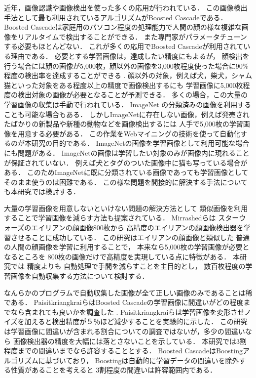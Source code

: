 近年，画像認識や画像検出を使った多くの応用が行われている．
この画像検出手法として最も利用されているアルゴリズムがBoosted Cascade\cite{Viola01rapidobject}である．
Boosted Cascadeは家庭用のパソコン程度の処理能力で人間の顔の様な複雑な画像をリアルタイムで検出することができる．
また専門家がパラメータチューンする必要もほとんどない．
これが多くの応用でBoosted Cascadeが利用されている理由である．
必要とする学習画像は，達成したい精度にもよるが，
顔検出を行う場合には顔の画像が5,000枚，顔以外の画像を3,000枚程度使った場合に90\%程度の検出率を達成することができる
\cite{Lienhart03empiricalanalysis}
.
顔以外の対象，例えば犬，柴犬，シャム猫といった対象をある程度以上の精度で画像検出するにも
学習画像に5,000枚程度の検出対象の画像が必要となることが予測できる．
多くの場合，この大量の学習画像の収集は手動で行われている．
ImageNet\cite{imagenet}
の分類済みの画像を利用することも可能な場合もある．
しかしImageNetに存在しない画像，例えば発売されたばかりの新製品や新種の動物などを画像検出するには
人手で5,000枚の学習画像を用意する必要がある．
この作業をWebマイニングの技術を使って自動化するのが本研究の目的である．
ImageNetの画像を学習画像として利用可能な場合にも問題がある．
ImageNetの画像は学習したい対象のみが画像内に現れることが保証されていない．
例えば犬とタグのついた画像中に猫も写っている場合がある．
このためImageNetに既に分類されている画像であっても学習画像としてそのまま使うのは困難である．
この様な問題を間接的に解決する手法についても本研究では検討する．

大量の学習画像を用意しないといけない問題の解決方法として
類似画像を利用することで学習画像を減らす方法も提案されている．
Mirrashed\cite{Mirrashed_2013_ICCV}らは
スターウォーズのエイリアンの顔画像800枚から
高精度のエイリアンの顔画像検出器を学習させることに成功している．
この研究はエイリアンの顔画像と類似した
普通の人間の顔画像を学習に利用することで，
本来なら5,000枚の学習画像が必要となるところを
800枚の画像だけで高精度を実現している点に特徴がある．
本研究では
精度よりも
自動処理で手間を減らすことを主目的とし，
数百枚程度の学習画像を自動収集する方法について検討する．

なんらかのプログラムで自動収集した画像が全て正しい画像のみであることは稀である．
PaisitkriangkraiらはBoosted Cascadeの学習画像に間違いがどの程度までなら含まれても良いかを調査した
\cite{DBLP:journals/corr/abs-1009-5758}
.
Paisitkriangkraiらは学習画像を変形させノイズを加えると検出精度が５％ほど減少することを実験的に示した．
この研究は学習画像に間違いが含まれる割合についての調査ではないが，多少の間違いなら
画像検出器の精度を大幅には落とさないことを示している．
本研究では3割程度までの間違いまでなら許容することとする．
Boosted CascadeはBoostingアルゴリズムに基づいており，
Boostingは自動的に学習データの間違いを除外する性質があることを考えると
3割程度の間違いは許容範囲内である．


